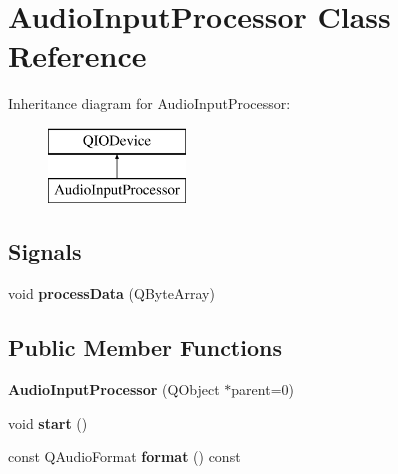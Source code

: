 \hypertarget{classAudioInputProcessor}{\section{Audio\+Input\+Processor Class Reference}
\label{classAudioInputProcessor}
}
Inheritance diagram for Audio\+Input\+Processor\+:\begin{figure}[H]
\begin{center}
\leavevmode
\includegraphics[height=2.000000cm]{classAudioInputProcessor}
\end{center}
\end{figure}
\subsection*{Signals}
\begin{DoxyCompactItemize}
\item 
\hypertarget{classAudioInputProcessor_af013a02bfef04a51fcab617633fb50ea}{void {\bfseries process\+Data} (Q\+Byte\+Array)}\label{classAudioInputProcessor_af013a02bfef04a51fcab617633fb50ea}

\end{DoxyCompactItemize}
\subsection*{Public Member Functions}
\begin{DoxyCompactItemize}
\item 
\hypertarget{classAudioInputProcessor_a4a53c5a1979a9d74ac58a834d3093ef9}{{\bfseries Audio\+Input\+Processor} (Q\+Object $\ast$parent=0)}\label{classAudioInputProcessor_a4a53c5a1979a9d74ac58a834d3093ef9}

\item 
\hypertarget{classAudioInputProcessor_a676d6ed660c621e1d3bf9700d757c688}{void {\bfseries start} ()}\label{classAudioInputProcessor_a676d6ed660c621e1d3bf9700d757c688}

\item 
\hypertarget{classAudioInputProcessor_a135b7ebe1b244ecec4751cd7f990172e}{const Q\+Audio\+Format {\bfseries format} () const }\label{classAudioInputProcessor_a135b7ebe1b244ecec4751cd7f990172e}

\end{DoxyCompactItemize}
